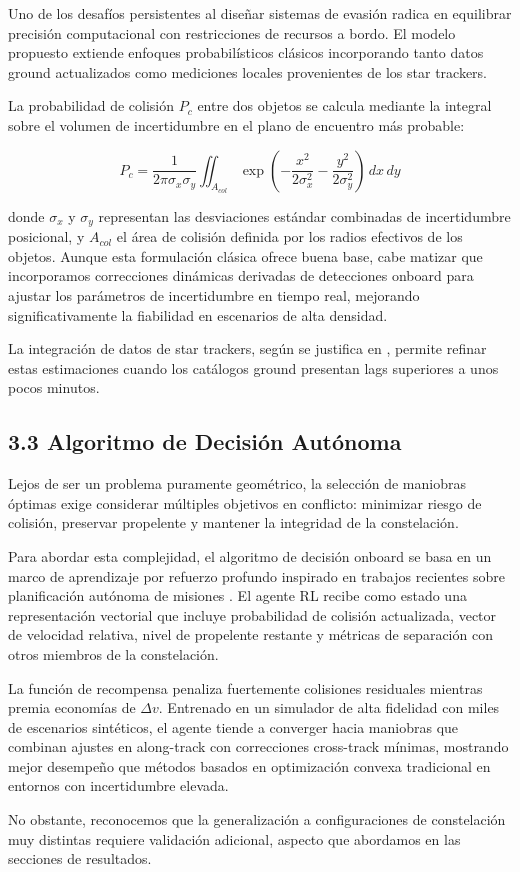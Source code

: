 Uno de los desafíos persistentes al diseñar sistemas de evasión radica en equilibrar precisión computacional con restricciones de recursos a bordo. El modelo propuesto extiende enfoques probabilísticos clásicos incorporando tanto datos ground actualizados como mediciones locales provenientes de los star trackers.

La probabilidad de colisión \( P_c \) entre dos objetos se calcula mediante la integral sobre el volumen de incertidumbre en el plano de encuentro más probable:

\begin{equation}
P_c = \frac{1}{2\pi \sigma_x \sigma_y} \iint_{A_{col}} \exp\left( -\frac{x^2}{2\sigma_x^2} - \frac{y^2}{2\sigma_y^2} \right) \, dx \, dy
\label{eq:pc}
\end{equation}

donde \(\sigma_x\) y \(\sigma_y\) representan las desviaciones estándar combinadas de incertidumbre posicional, y \(A_{col}\) el área de colisión definida por los radios efectivos de los objetos. Aunque esta formulación clásica ofrece buena base, cabe matizar que incorporamos correcciones dinámicas derivadas de detecciones onboard para ajustar los parámetros de incertidumbre en tiempo real, mejorando significativamente la fiabilidad en escenarios de alta densidad.

La integración de datos de star trackers, según se justifica en \cite{campiti2025detectability}, permite refinar estas estimaciones cuando los catálogos ground presentan lags superiores a unos pocos minutos.

\subsection{3.3 Algoritmo de Decisión Autónoma}

Lejos de ser un problema puramente geométrico, la selección de maniobras óptimas exige considerar múltiples objetivos en conflicto: minimizar riesgo de colisión, preservar propelente y mantener la integridad de la constelación. 

Para abordar esta complejidad, el algoritmo de decisión onboard se basa en un marco de aprendizaje por refuerzo profundo inspirado en trabajos recientes sobre planificación autónoma de misiones \cite{patnala2025oos}. El agente RL recibe como estado una representación vectorial que incluye probabilidad de colisión actualizada, vector de velocidad relativa, nivel de propelente restante y métricas de separación con otros miembros de la constelación.

La función de recompensa penaliza fuertemente colisiones residuales mientras premia economías de \(\Delta v\). Entrenado en un simulador de alta fidelidad con miles de escenarios sintéticos, el agente tiende a converger hacia maniobras que combinan ajustes en along-track con correcciones cross-track mínimas, mostrando mejor desempeño que métodos basados en optimización convexa tradicional en entornos con incertidumbre elevada.

No obstante, reconocemos que la generalización a configuraciones de constelación muy distintas requiere validación adicional, aspecto que abordamos en las secciones de resultados.